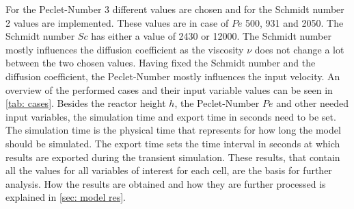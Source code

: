 \documentclass[../thesis.tex]{subfiles}
\begin{document}
For the Peclet-Number 3 different values are chosen and for the Schmidt number 2 values are implemented. These values are in case of $Pe$ 500, 931 and 2050. The Schmidt number $Sc$ has either a value of 2430 or 12000. The Schmidt number mostly influences the diffusion coefficient as the viscosity $\nu$ does not change a lot between the two chosen values. Having fixed the Schmidt number and the diffusion coefficient, the Peclet-Number mostly influences the input velocity. An overview of the performed cases and their input variable values can be seen in \autoref{tab: cases}. Besides the reactor height $h$, the Peclet-Number $Pe$ and other needed input variables, the simulation time and export time in seconds need to be set. The simulation time is the physical time that represents for how long the model should be simulated. The export time sets the time interval in seconds at which results are exported during the transient simulation. These results, that contain all the values for all variables of interest for each cell, are the basis for further analysis. How the results are obtained and how they are further processed is explained in \autoref{sec: model res}.
\end{document}

